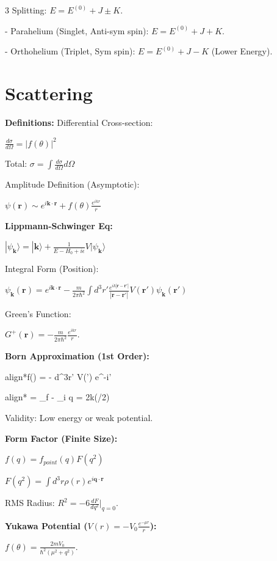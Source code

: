 \documentclass[10pt,a4paper]{article}
\newcommand{\important}[1]{\begin{empheq}[box=\fbox]{align*}#1\end{empheq}}
\begin{document}
\begin{multicols*}{3}
Splitting: $E = E^{(0)} + J \pm K$.

- Parahelium (Singlet, Anti-sym spin): $E = E^{(0)} + J + K$.

- Orthohelium (Triplet, Sym spin): $E = E^{(0)} + J - K$ (Lower Energy).


\section*{Scattering}
\textbf{Definitions:}
Differential Cross-section: 

$\frac{d\sigma}{d\Omega} = |f(\theta)|^2$

Total: $\sigma = \int \frac{d\sigma}{d\Omega} d\Omega$

Amplitude Definition (Asymptotic): 

$\psi(\mathbf{r}) \sim e^{i\mathbf{k}\cdot\mathbf{r}} + f(\theta) \frac{e^{ikr}}{r}$

\textbf{Lippmann-Schwinger Eq:}

$|\psi_{\mathbf{k}}\rangle = |\mathbf{k}\rangle + \frac{1}{E - H_0 + i\epsilon} V |\psi_{\mathbf{k}}\rangle$

Integral Form (Position): 

$\psi_{\mathbf{k}}(\mathbf{r}) = e^{i\mathbf{k}\cdot\mathbf{r}} - \frac{m}{2\pi\hbar^2} \int d^3r' \frac{e^{ik|\mathbf{r}-\mathbf{r}'|}}{|\mathbf{r}-\mathbf{r}'|} V(\mathbf{r}') \psi_{\mathbf{k}}(\mathbf{r}')$

Green's Function: 

$G^+(\mathbf{r}) = -\frac{m}{2\pi\hbar^2} \frac{e^{ikr}}{r}$.

\textbf{Born Approximation (1st Order):}

\important{f() = - \int d^3r' V(\mathbf{r}') e^{-i\cdot\mathbf{r}'}}

\important{\mathbf{q} = _f - \mathbf{k}_i \quad q = 2k\sin(\theta/2) }

Validity: Low energy or weak potential.

\textbf{Form Factor (Finite Size):}

$f(q) = f_{point}(q) F(q^2)$ 

$F(q^2) = \int d^3r \rho(r) e^{i\mathbf{q}\cdot\mathbf{r}}$

RMS Radius: $R^2 = -6 \frac{dF}{dq^2}|_{q=0}$.

\textbf{Yukawa Potential ($V(r) = -V_0 \frac{e^{-\mu r}}{r}$):}

$f(\theta) = \frac{2mV_0}{\hbar^2(\mu^2+q^2)}$.


\end{multicols*}
\end{document}
